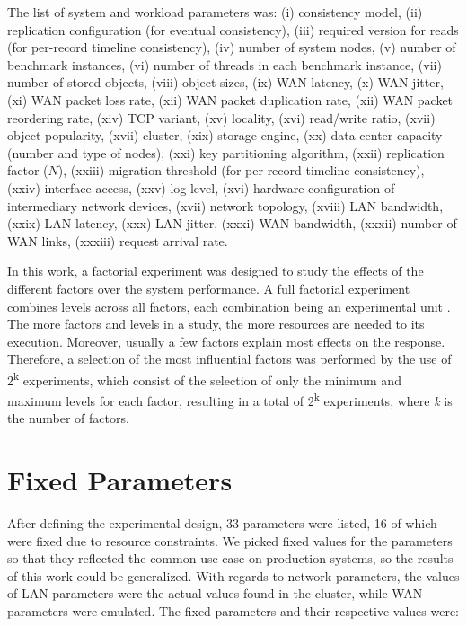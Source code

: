 \documentclass[man,floatsintext,12pt]{apa6}
\begin{document}
The list of system and workload parameters was: (i) consistency model, (ii)
replication configuration (for eventual consistency), (iii) required version
for reads (for per-record timeline consistency), (iv) number of system nodes,
(v) number of benchmark instances, (vi) number of threads in each benchmark
instance, (vii) number of stored objects, (viii) object sizes, (ix) WAN
latency, (x) WAN jitter, (xi) WAN packet loss rate, (xii) WAN packet
duplication rate, (xii) WAN packet reordering rate, (xiv) TCP variant, (xv)
locality, (xvi) read/write ratio, (xvii) object popularity, (xvii) cluster,
(xix) storage engine, (xx) data center capacity (number and type of nodes),
(xxi) key partitioning algorithm, (xxii) replication factor ($ N $), (xxiii)
migration threshold (for per-record timeline consistency), (xxiv) interface
access, (xxv) log level, (xvi) hardware configuration of intermediary network
devices, (xvii) network topology, (xviii) LAN bandwidth, (xxix) LAN latency,
(xxx) LAN jitter, (xxxi) WAN bandwidth, (xxxii) number of WAN links, (xxxiii)
request arrival rate.

In this work, a factorial experiment was designed to study the effects of the
different factors over the system performance. A full factorial experiment
combines levels across all factors, each combination being an experimental
unit \parencite{Jain1991}. The more factors and levels in a study, the more
resources are needed to its execution. Moreover, usually a few factors explain
most effects on the response. Therefore, a selection of the most influential
factors was performed by the use of 2\textsuperscript{k} experiments, which
consist of the selection of only the minimum and maximum levels for each
factor, resulting in a total of 2\textsuperscript{k} experiments, where
\textit{k} is the number of factors.

\section{Fixed Parameters}

After defining the experimental design, 33 parameters were listed, 16 of which
were fixed due to resource constraints. We picked fixed values for the
parameters so that they reflected the common use case on production systems, so
the results of this work could be generalized. With regards to network
parameters, the values of LAN parameters were the actual values found in the
cluster, while WAN parameters were emulated. The fixed parameters and their
respective values were:
\end{document}
